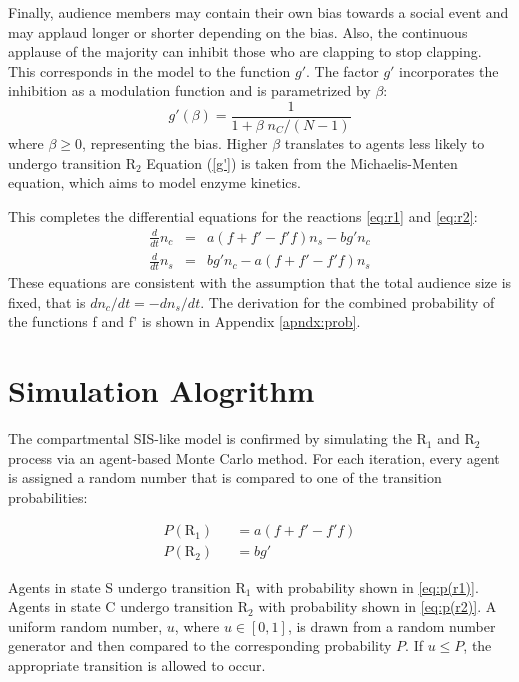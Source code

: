 Finally, audience members may contain their own bias towards a social event and may applaud longer or shorter depending on the bias.
Also, the continuous applause of the majority can inhibit those who are clapping to stop clapping.
This corresponds in the model to the function $g'$.
The factor $g'$ incorporates the inhibition as a modulation function and is parametrized by $\beta$: 
\begin{equation}\label{eq:g'}
  g'(\beta) = \frac{1}{1 + \beta\;n_C /(N-1)}
\end{equation}
where $\beta \geq 0$, representing the bias.
Higher $\beta$ translates to agents less likely to undergo transition $\mathrm{R}_{2}$ 
Equation (\eqref{g'}) is taken from the Michaelis-Menten equation, which aims to model enzyme kinetics\cite{michaelisconstant}.

This completes the differential equations for the reactions \eqref{eq:r1} and \eqref{eq:r2}:
\begin{eqnarray}
\frac{d}{dt}n_{c} &=& a (f+f'-f'f) n_{s} - b g' n_{c}\label{eq:diff1} \\
\frac{d}{dt}n_{s} &=& b g' n_{c} - a (f+f'-f'f) n_{s}\label{eq:diff2}
\end{eqnarray}
These equations are consistent with the assumption that the total audience size is fixed, that is $dn_{c}/dt = -dn_{s}/dt$.
The derivation for the combined probability of the functions f and f' is shown in Appendix \ref{apndx:prob}.



\section{Simulation Alogrithm}
\hspace{\parindent} The compartmental SIS-like model is confirmed by simulating the $\mathrm{R}_{1}$ and $\mathrm{R}_{2}$ process via an agent-based Monte Carlo method. For each iteration, every agent is assigned a random number that is compared to one of the transition probabilities:

\begin{eqnarray}
P(\mathrm{R}_{1}) &&= a(f + f' - f'f) \label{eq:p(r1)} \\
P(\mathrm{R}_{2}) &&= bg' \label{eq:p(r2)}
\end{eqnarray}

Agents in state S undergo transition $\mathrm{R}_{1}$ with probability shown in \ref{eq:p(r1)}.
Agents in state C undergo transition $\mathrm{R}_{2}$ with probability shown in \ref{eq:p(r2)}.
A uniform random number, $u$, where $u \in [0,1]$, is drawn from a random number generator and then compared to the corresponding probability $P$.
If $u \leq P$, the appropriate transition is allowed to occur.

